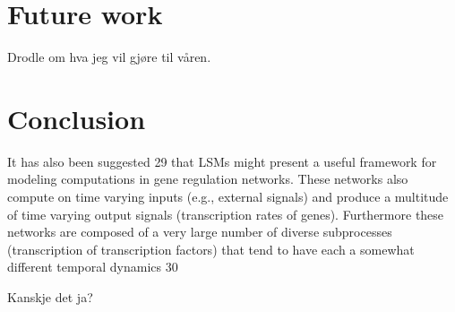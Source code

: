 \section{Future work}

Drodle om hva jeg vil gjøre til våren.

\section{Conclusion}

It has also been suggested 29 that LSMs might present a useful framework
for modeling computations in gene regulation networks. These networks
also compute on time varying inputs (e.g., external signals) and
produce a multitude of time varying output signals (transcription rates of
genes). Furthermore these networks are composed of a very large number
of diverse subprocesses (transcription of transcription factors) that tend to
have each a somewhat different temporal dynamics 30

Kanskje det ja?
